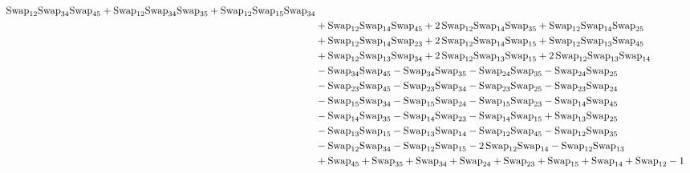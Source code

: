 \documentclass[12pt,dvipsnames,accepted=2016-08-18,a4paper,onecolumn]{quantumarticle}
\numberwithin{equation}{section}
\theoremstyle{definition}
\begin{document}
\begin{align*}
        \textnormal{Swap}_{12} \textnormal{Swap}_{34} \textnormal{Swap}_{45} + \textnormal{Swap}_{12} \textnormal{Swap}_{34} \textnormal{Swap}_{35} + \textnormal{Swap}_{12} \textnormal{Swap}_{15} \textnormal{Swap}_{34}\\ & + \textnormal{Swap}_{12} \textnormal{Swap}_{14} \textnormal{Swap}_{45} + 2\,\textnormal{Swap}_{12} \textnormal{Swap}_{14} \textnormal{Swap}_{35} +
        \textnormal{Swap}_{12} \textnormal{Swap}_{14} \textnormal{Swap}_{25}\\ & + \textnormal{Swap}_{12} \textnormal{Swap}_{14} \textnormal{Swap}_{23} + 2\,\textnormal{Swap}_{12} \textnormal{Swap}_{14} \textnormal{Swap}_{15} + \textnormal{Swap}_{12} \textnormal{Swap}_{13} \textnormal{Swap}_{45}\\ & + \textnormal{Swap}_{12} \textnormal{Swap}_{13} \textnormal{Swap}_{34} +
        2\,\textnormal{Swap}_{12} \textnormal{Swap}_{13} \textnormal{Swap}_{15} + 2\,\textnormal{Swap}_{12} \textnormal{Swap}_{13} \textnormal{Swap}_{14}\\ & - \textnormal{Swap}_{34} \textnormal{Swap}_{45} - \textnormal{Swap}_{34} \textnormal{Swap}_{35} - \textnormal{Swap}_{24} \textnormal{Swap}_{35} - \textnormal{Swap}_{24} \textnormal{Swap}_{25}\\ & -
        \textnormal{Swap}_{23} \textnormal{Swap}_{45} - \textnormal{Swap}_{23} \textnormal{Swap}_{34} - \textnormal{Swap}_{23} \textnormal{Swap}_{25} - \textnormal{Swap}_{23} \textnormal{Swap}_{24}\\ & - \textnormal{Swap}_{15} \textnormal{Swap}_{34} - \textnormal{Swap}_{15} \textnormal{Swap}_{24} - \textnormal{Swap}_{15} \textnormal{Swap}_{23} -
        \textnormal{Swap}_{14} \textnormal{Swap}_{45}\\ & - \textnormal{Swap}_{14} \textnormal{Swap}_{35} - \textnormal{Swap}_{14} \textnormal{Swap}_{23} - \textnormal{Swap}_{14} \textnormal{Swap}_{15} + \textnormal{Swap}_{13} \textnormal{Swap}_{25}\\ & - \textnormal{Swap}_{13} \textnormal{Swap}_{15} - \textnormal{Swap}_{13} \textnormal{Swap}_{14} -
        \textnormal{Swap}_{12} \textnormal{Swap}_{45} - \textnormal{Swap}_{12} \textnormal{Swap}_{35}\\ & - \textnormal{Swap}_{12} \textnormal{Swap}_{34} - \textnormal{Swap}_{12} \textnormal{Swap}_{15} - 2\,\textnormal{Swap}_{12} \textnormal{Swap}_{14} - \textnormal{Swap}_{12} \textnormal{Swap}_{13}\\ & + \textnormal{Swap}_{45} + \textnormal{Swap}_{35}
        + \textnormal{Swap}_{34} + \textnormal{Swap}_{24} + \textnormal{Swap}_{23} + \textnormal{Swap}_{15} + \textnormal{Swap}_{14} + \textnormal{Swap}_{12} - 1\\

\end{align*}
\end{document}
